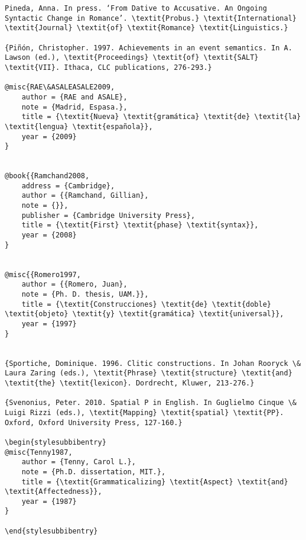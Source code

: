 \documentclass[output=paper,modfonts,nonflat]{langsci/langscibook}
\begin{document}
\begin{verbatim}
Pineda, Anna. In press. ‘From Dative to Accusative. An Ongoing Syntactic Change in Romance’. \textit{Probus.} \textit{International} \textit{Journal} \textit{of} \textit{Romance} \textit{Linguistics.}

{Piñón, Christopher. 1997. Achievements in an event semantics. In A. Lawson (ed.), \textit{Proceedings} \textit{of} \textit{SALT} \textit{VII}. Ithaca, CLC publications, 276-293.}

@misc{RAE\&ASALEASALE2009,
	author = {RAE and ASALE},
	note = {Madrid, Espasa.},
	title = {\textit{Nueva} \textit{gramática} \textit{de} \textit{la} \textit{lengua} \textit{española}},
	year = {2009}
}


@book{{Ramchand2008,
	address = {Cambridge},
	author = {{Ramchand, Gillian},
	note = {}},
	publisher = {Cambridge University Press},
	title = {\textit{First} \textit{phase} \textit{syntax}},
	year = {2008}
}


@misc{{Romero1997,
	author = {{Romero, Juan},
	note = {Ph. D. thesis, UAM.}},
	title = {\textit{Construcciones} \textit{de} \textit{doble} \textit{objeto} \textit{y} \textit{gramática} \textit{universal}},
	year = {1997}
}


{Sportiche, Dominique. 1996. Clitic constructions. In Johan Rooryck \& Laura Zaring (eds.), \textit{Phrase} \textit{structure} \textit{and} \textit{the} \textit{lexicon}. Dordrecht, Kluwer, 213-276.}

{Svenonius, Peter. 2010. Spatial P in English. In Guglielmo Cinque \& Luigi Rizzi (eds.), \textit{Mapping} \textit{spatial} \textit{PP}. Oxford, Oxford University Press, 127-160.}

\begin{stylesubbibentry}
@misc{Tenny1987,
	author = {Tenny, Carol L.},
	note = {Ph.D. dissertation, MIT.},
	title = {\textit{Grammaticalizing} \textit{Aspect} \textit{and} \textit{Affectedness}},
	year = {1987}
}

\end{stylesubbibentry}

\end{verbatim}
\sloppy\printbibliography[heading=subbibliography,notkeyword=this]
\end{document}
